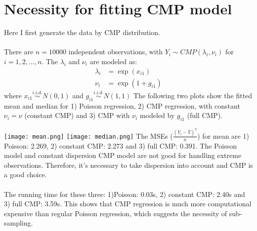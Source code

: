 \documentclass[]{article}
\begin{document}
\section{Necessity for fitting CMP model}
Here I first generate the data by CMP distribution.\\
\\
There are $n = 10000$ independent observations, with $Y_i \sim CMP(\lambda_i, \nu_i)$ for $i = 1, 2,..., n$. The $\lambda_i$ and $\nu_i$ are modeled as:
\begin{align*}
	\lambda_i &= \exp(x_{i1})\\
	\nu_i &= \exp(1 + g_{i1})
\end{align*}
where $x_{i1} \stackrel{i.i.d.}{\sim} N(0, 1)$ and $g_{i1} \stackrel{i.i.d.}{\sim} N(1, 1)$ The following two plots show the fitted mean and median for 1) Poisson regression, 2) CMP regression, with constant $\nu_i = \nu$ (constant CMP) and 3) CMP with $\nu_i$ modeled by $g_{i1}$ (full CMP).\\
\graphicspath{{D:/GitHub/sub-sampling/COM-Poisson/cdoe/}}
\texttt{[image: mean.png]}
\texttt{[image: median.png]}
The MSEs ($\frac{(Y_i - \bar{Y})^2}{n}$) for mean are 1) Poisson: 2.269, 2) constant CMP: 2.273 and 3) full CMP: 0.391. The Poisson model and constant dispersion CMP model are not good for handling extreme observations. Therefore, it's necessary to take dispersion into account and CMP is a good choice.\\
\\
The running time for these three: 1)Poisson: 0.03s, 2) constant CMP: 2.40s and 3) full CMP: 3.59s. This shows that CMP regression is much more computational expensive than regular Poisson regression, which suggests the necessity of sub-sampling.
\end{document}

